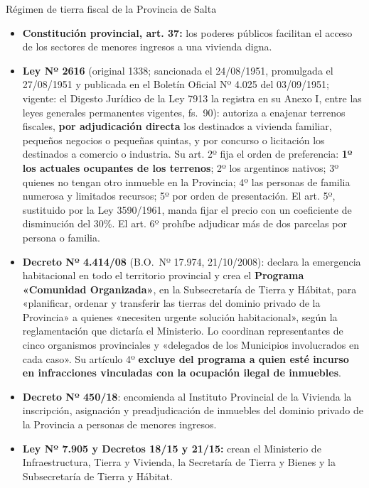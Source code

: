 \begin{ficha}{Régimen de tierra fiscal de la Provincia de Salta}
\begin{itemize}[leftmargin=*,nosep]
\item \textbf{Constitución provincial, art. 37:} los poderes públicos facilitan el acceso de los sectores de menores ingresos a una vivienda digna.
\item \textbf{Ley Nº 2616} (original 1338; sancionada el 24/08/1951, promulgada el 27/08/1951 y publicada en el Boletín Oficial Nº 4.025 del 03/09/1951; vigente: el Digesto Jurídico de la Ley 7913 la registra en su Anexo I, entre las leyes generales permanentes vigentes, fs.\ 90): autoriza a enajenar terrenos fiscales, \textbf{por adjudicación directa} los destinados a vivienda familiar, pequeños negocios o pequeñas quintas, y por concurso o licitación los destinados a comercio o industria. Su art. 2º fija el orden de preferencia: \textbf{1º los actuales ocupantes de los terrenos}; 2º los argentinos nativos; 3º quienes no tengan otro inmueble en la Provincia; 4º las personas de familia numerosa y limitados recursos; 5º por orden de presentación. El art. 5º, sustituido por la Ley 3590/1961, manda fijar el precio con un coeficiente de disminución del 30\%. El art. 6º prohíbe adjudicar más de dos parcelas por persona o familia.
\item \textbf{Decreto Nº 4.414/08} (B.O.\ Nº 17.974, 21/10/2008): declara la emergencia habitacional en todo el territorio provincial y crea el \textbf{Programa «Comunidad Organizada»}, en la Subsecretaría de Tierra y Hábitat, para «planificar, ordenar y transferir las tierras del dominio privado de la Provincia» a quienes «necesiten urgente solución habitacional», según la reglamentación que dictaría el Ministerio. Lo coordinan representantes de cinco organismos provinciales y «delegados de los Municipios involucrados en cada caso». Su artículo 4º \textbf{excluye del programa a quien esté incurso en infracciones vinculadas con la ocupación ilegal de inmuebles}.
\item \textbf{Decreto Nº 450/18}: encomienda al Instituto Provincial de la Vivienda la inscripción, asignación y preadjudicación de inmuebles del dominio privado de la Provincia a personas de menores ingresos.
\item \textbf{Ley Nº 7.905 y Decretos 18/15 y 21/15:} crean el Ministerio de Infraestructura, Tierra y Vivienda, la Secretaría de Tierra y Bienes y la Subsecretaría de Tierra y Hábitat.

\end{itemize}
\end{ficha}
